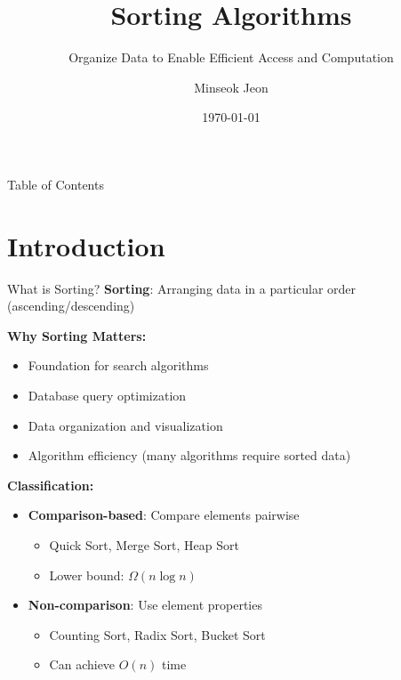 \documentclass[aspectratio=169]{beamer}
\title{Sorting Algorithms}
\subtitle{Organize Data to Enable Efficient Access and Computation}
\author{Minseok Jeon}
\institute{DGIST}
\date{\today}
\begin{document}
\begin{frame}
  \titlepage
\end{frame}

\begin{frame}{Table of Contents}
  \tableofcontents
\end{frame}

\section{Introduction}

\begin{frame}{What is Sorting?}
  \textbf{Sorting}: Arranging data in a particular order (ascending/descending)

  \vspace{0.3cm}
  \textbf{Why Sorting Matters:}
  \begin{itemize}
    \item Foundation for search algorithms
    \item Database query optimization
    \item Data organization and visualization
    \item Algorithm efficiency (many algorithms require sorted data)
  \end{itemize}

  \vspace{0.3cm}
  \textbf{Classification:}
  \begin{itemize}
    \item \textbf{Comparison-based}: Compare elements pairwise
    \begin{itemize}
      \item Quick Sort, Merge Sort, Heap Sort
      \item Lower bound: $\Omega(n \log n)$
    \end{itemize}
    \item \textbf{Non-comparison}: Use element properties
    \begin{itemize}
      \item Counting Sort, Radix Sort, Bucket Sort
      \item Can achieve $O(n)$ time
    \end{itemize}
  \end{itemize}
\end{frame}
\end{document}
